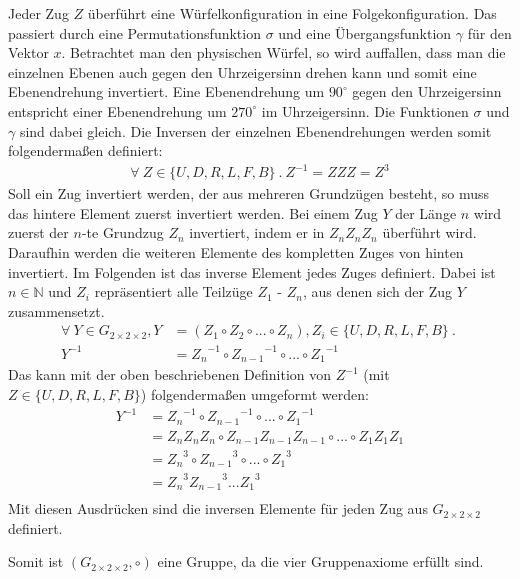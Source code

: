 \documentclass[12pt,a4paper, usenames, dvipsnames]{article}
\theoremstyle{mystyle}
\theoremstyle{definition}
\newcommand{\Gtwo}{\ensuremath{G_{2\times 2\times 2}}}
\begin{document}
\begin{description}
Jeder Zug $Z$ überführt eine Würfelkonfiguration in eine Folgekonfiguration. 
Das passiert durch eine Permutationsfunktion $\sigma$ und eine Übergangsfunktion $\gamma$ für den Vektor $x$. 
Betrachtet man den physischen Würfel, so wird auffallen, dass man die einzelnen Ebenen auch gegen den Uhrzeigersinn drehen kann und somit eine Ebenendrehung invertiert. Eine Ebenendrehung um $90^\circ$ gegen den Uhrzeigersinn entspricht einer Ebenendrehung um $270^\circ$ im Uhrzeigersinn. Die Funktionen $\sigma$ und $\gamma$ sind dabei gleich.
Die Inversen der einzelnen Ebenendrehungen werden somit folgendermaßen definiert:
\begin{align*}
\forall \ Z \in \{U, D, R, L, F, B\} \ . \ Z^{-1} = ZZZ = Z^3
\end{align*}
Soll ein Zug invertiert werden, der aus mehreren Grundzügen besteht, so muss das hintere Element zuerst invertiert werden. Bei einem Zug $Y$ der Länge $n$ wird zuerst der $n$-te Grundzug $Z_n$ invertiert, indem er in $Z_nZ_nZ_n$ überführt wird. Daraufhin werden die weiteren Elemente des kompletten Zuges von hinten invertiert. Im Folgenden ist das inverse Element jedes Zuges definiert. Dabei ist $n \in \mathbb{N}$ und $Z_i$ repräsentiert alle Teilzüge $Z_1$ - $Z_n$, aus denen sich der Zug $Y$ zusammensetzt.
\begin{align*}
\forall \ Y \in \Gtwo, Y & = (Z_1 \circ Z_2 \circ ... \circ Z_n), Z_{i} \in \{U, D, R, L, F, B\} \ . \  \\
Y^{-1} & = {Z_n}^{-1} \circ {Z_{n-1}}^{-1} \circ ... \circ {Z_1}^{-1} 
\end{align*}
Das kann mit der oben beschriebenen Definition von $Z^{-1}$ (mit $Z \in \{U, D, R, L, F, B\} $) folgendermaßen umgeformt werden:
\begin{align*}
Y^{-1} & = {Z_n}^{-1} \circ {Z_{n-1}}^{-1} \circ ... \circ {Z_1}^{-1} \\
& = Z_nZ_nZ_n \circ Z_{n-1}Z_{n-1}Z_{n-1} \circ ... \circ Z_1Z_1Z_1 \\
& = {Z_n}^3 \circ {Z_{n-1}}^3 \circ ... \circ {Z_1}^3 \\
& = {Z_n}^3{Z_{n-1}}^3 ...  {Z_1}^3 \\
\end{align*}
Mit diesen Ausdrücken sind die inversen Elemente für jeden Zug aus $\Gtwo$ definiert.



\end{description}
Somit ist $(\Gtwo, \circ)$ eine Gruppe, da die vier Gruppenaxiome erfüllt sind. 
\end{document}
